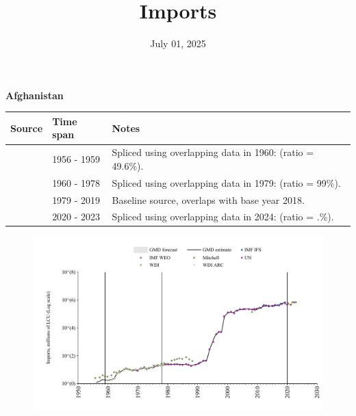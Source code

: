 \documentclass[12pt,a4paper,landscape]{article}
\begin{document}
\title{\Large Imports}
\date{July 01, 2025}
\maketitle
\thispagestyle{empty}

\clearpage
\setcounter{page}{1}
\hypersetup{colorlinks=true,linkcolor=blue,linktoc=all}
\label{toc}
\tableofcontents
\thispagestyle{empty}
\setcounter{page}{3}
\begin{adjustbox}{max totalsize={\paperwidth}{\paperheight},center}
\begin{minipage}[t][\textheight][t]{\textwidth}
\vspace*{0.5cm}
{}
\begin{center}
{\Large\bfseries Afghanistan}
\end{center}
\vspace{0.5cm}
\begin{table}[H]
\centering
\small
\begin{tabular}{|l|l|l|}
\hline
\textbf{Source} & \textbf{Time span} & \textbf{Notes} \\
\hline
\rowcolor{white}\cite{Mitchell}& 1956 - 1959 &Spliced using overlapping data in 1960: (ratio = 49.6\%).\\
\rowcolor{lightgray}\cite{WDI}& 1960 - 1978 &Spliced using overlapping data in 1979: (ratio = 99\%).\\
\rowcolor{white}\cite{UN}& 1979 - 2019 &Baseline source, overlaps with base year 2018.\\
\rowcolor{lightgray}\cite{WDI}& 2020 - 2023 &Spliced using overlapping data in 2024: (ratio = .\%).\\
\hline
\end{tabular}
\end{table}
\begin{figure}[H]
\centering
\includegraphics[width=\textwidth,height=0.6\textheight,keepaspectratio]{graphs/AFG_imports.pdf}
\end{figure}
\end{minipage}
\end{adjustbox}
\end{document}
